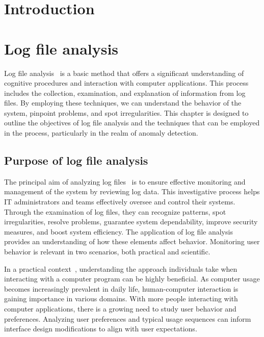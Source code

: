 \chapter{Introduction}
\label{chap:introduction}


\chapter{Log file analysis}
\label{chap:log-analysis}

Log file analysis~\cite{hulshof2005logfile} is a basic method that offers a significant understanding of cognitive procedures and interaction with computer applications. This process includes the collection, examination, and explanation of information from log files. By employing these techniques, we can understand the behavior of the system, pinpoint problems, and spot irregularities. This chapter is designed to outline the objectives of log file analysis and the techniques that can be employed in the process, particularly in the realm of anomaly detection.

\section{Purpose of log file analysis}
\label{sec:purpose}
The principal aim of analyzing log files~\cite{aivalis2020logfile} is to ensure effective monitoring and management of the system by reviewing log data. This investigative process helps IT administrators and teams effectively oversee and control their systems. Through the examination of log files, they can recognize patterns, spot irregularities, resolve problems, guarantee system dependability, improve security measures, and boost system efficiency. The application of log file analysis provides an understanding of how these elements affect behavior. Monitoring user behavior is relevant in two scenarios, both practical and scientific.

In a practical context~\cite{hulshof2005logfile}, understanding the approach individuals take when interacting with a computer program can be highly beneficial. As computer usage becomes increasingly prevalent in daily life, human-computer interaction is gaining importance in various domains. With more people interacting with computer applications, there is a growing need to study user behavior and preferences. Analyzing user preferences and typical usage sequences can inform interface design modifications to align with user expectations.

